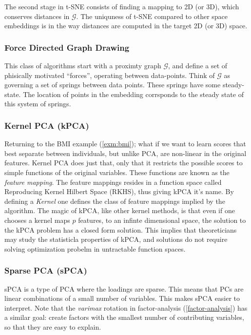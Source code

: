 \documentclass[]{book}
\theoremstyle{definition}
\theoremstyle{definition}
\theoremstyle{definition}
\theoremstyle{remark}
\begin{document}
The second stage in t-SNE consists of finding a mapping to 2D (or 3D), which conserves distances in \(\mathcal{G}\).
The uniquness of t-SNE compared to other space embeddings is in the way distances are computed in the target 2D (or 3D) space.

\hypertarget{force-directed-graph-drawing}{%
\subsubsection{Force Directed Graph Drawing}\label{force-directed-graph-drawing}}

This class of algorithms start with a proximty graph \(\mathcal{G}\), and define a set of phisically motivated ``forces'', operating between data-points.
Think of \(\mathcal{G}\) as governing a set of springs between data points.
These springs have some steady-state.
The location of points in the embedding corrsponds to the steady state of this system of springs.

\hypertarget{kernel-pca-kpca}{%
\subsubsection{Kernel PCA (kPCA)}\label{kernel-pca-kpca}}

Returning to the BMI example (\ref{exm:bmi}); what if we want to learn scores that best separate between individuals, but unlike PCA, are non-linear in the original features.
Kernel PCA does just that, only that it restricts the possible scores to simple functions of the original variables.
These functions are known as the \emph{feature mapping}.
The feature mappings resides in a function space called Reproducing Kernel Hilbert Space (RKHS), thus giving kPCA it's name.
By defining a \emph{Kernel} one defines the class of feature mappings implied by the algorithm.
The magic of kPCA, like other kernel methods, is that even if one chooses a kernel maps \(p\) features, to an infinte dimensional space, the solution to the kPCA problem has a closed form solution.
This implies that theoreticians may study the statisticla properties of kPCA, and solutions do not require solving optimization probelm in untractable function spaces.

\hypertarget{sparse-pca-spca}{%
\subsubsection{Sparse PCA (sPCA)}\label{sparse-pca-spca}}

sPCA is a type of PCA where the loadings are sparse.
This means that PCs are linear combinations of a small number of variables.
This makes sPCA easier to interpret.
Note that the \emph{varimax} rotation in factor-analysis (\ref{factor-analysis}) has a similar goal: create factors with the smallest number of contributing variables, so that they are easy to explain.
\end{document}
